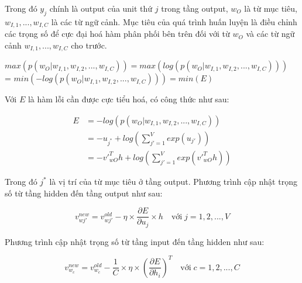 Trong đó $y_{j}$ chính là output của unit thứ $j$ trong tầng output, $w_{O}$ là từ mục tiêu, $w_{I,1} , ..., w_{I, C}$ là các từ ngữ cảnh. Mục tiêu của quá trình huấn luyện là điều chỉnh các trọng số để cực đại hoá hàm phân phối bên trên đối với từ $w_{O}$ và các từ ngữ cảnh $w_{I, 1}, ..., w_{I, C}$ cho trước.
\begin{center}
    $max\left( p\left( w_{O} | w_{I,1},w_{I,2}, ..., w_{I,C} \right) \right) = max\left( log\left( p\left( w_{O} | w_{I,1},w_{I,2}, ..., w_{I,C} \right) \right) \right)$ \\ = $min\left( -log\left( p\left( w_{O} | w_{I,1},w_{I,2}, ..., w_{I,C} \right) \right) \right) = min(E) $
\end{center}

Với $E$ là hàm lỗi cần được cực tiểu hoá, có công thức như sau:
\begin{center}
    \begin{equation}
    \begin{split}
        E & = -log\left( p\left( w_{O} | w_{I,1},w_{I,2}, ..., w_{I,C} \right) \right) \\
        & = -u_{j^*} + log\left( \sum_{j'=1}^{V}exp\left( u_{j'} \right) \right) \\
        & = -v'^T_{wO} h + log\left( \sum_{j'=1}^{V}exp\left( v'^T_{wO} h \right) \right)
    \end{split}
    \end{equation}
\end{center}

Trong đó $j^*$ là vị trí của từ mục tiêu ở tầng output. Phương trình cập nhật trọng số từ tầng hidden đến tầng output như sau:
\begin{center}
    \begin{equation}
        v_{wj'}^{new} = v_{wj'}^{old} - \eta \times \frac{\partial E}{\partial u_{j}} \times h \quad \textrm{với} \; j = 1, 2, ..., V 
    \end{equation}
\end{center}

Phương trình cập nhật trọng số từ tầng input đến tầng hidden như sau:
\begin{center}
    \begin{equation}
        v_{w_{c}}^{new} = v_{w_{c}}^{old} - \frac{1}{C} \times \eta \times \left( \frac{\partial E}{\partial h_{i}} \right)^T \quad \textrm{với} \; c = 1, 2, ..., C
    \end{equation}
\end{center}

